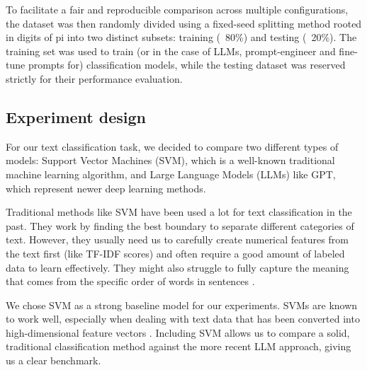 To facilitate a fair and reproducible comparison across multiple configurations, the dataset was then randomly divided using a fixed-seed splitting method rooted in digits of pi into two distinct subsets: training (~80\%) and testing (~20\%). The training set was used to train (or in the case of LLMs, prompt-engineer and fine-tune prompts for) classification models, while the testing dataset was reserved strictly for their performance evaluation.


\subsection{Experiment design}
%
%
For our text classification task, we decided to compare two different types of models: Support Vector Machines (SVM), which is a well-known traditional machine learning algorithm, and Large Language Models (LLMs) like GPT, which represent newer deep learning methods.

Traditional methods like SVM have been used a lot for text classification in the past. They work by finding the best boundary to separate different categories of text. However, they usually need us to carefully create numerical features from the text first (like TF-IDF scores) and often require a good amount of labeled data to learn effectively. They might also struggle to fully capture the meaning that comes from the specific order of words in sentences \cite{sarker2021machine}.

We chose SVM as a strong baseline model for our experiments. SVMs are known to work well, especially when dealing with text data that has been converted into high-dimensional feature vectors \cite{Joachims1998}. Including SVM allows us to compare a solid, traditional classification method against the more recent LLM approach, giving us a clear benchmark.

